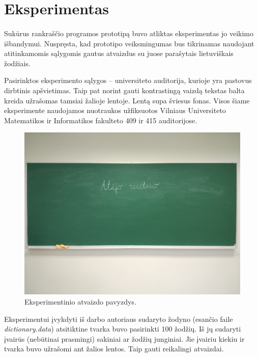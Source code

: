 \documentclass[a4paper,12pt]{article}
\begin{document}
\clearpage
\section{Eksperimentas}
\paragraph{} Sukūrus rankraščio programos prototipą buvo atliktas eksperimentas jo veikimo išbandymui. Nuspręsta, kad prototipo veiksmingumas bus tikrinamas naudojant atitinkamomis sąlygomis gautus atvaizdus su juose parašytais lietuviškais žodžiais.

Pasirinktos eksperimento sąlygos – universiteto auditorija, kurioje yra pastovus dirbtinis apšvietimas. Taip pat norint gauti kontrastingą vaizdą tekstas balta kreida užrašomas tamsiai žalioje lentoje. Lentą supa šviesus fonas. Visos šiame eksperimente naudojamos nuotraukos užfiksuotos Vilniaus Universiteto Matematikos ir Informatikos fakulteto 409 ir 415 auditorijose.

		\begin{figure}[H]
			\centering
			\includegraphics[scale=0.3]{images/sampleboard}
			\caption{Eksperimentinio atvaizdo pavyzdys.}   %
			\label{img:sampleboard}
		\end{figure}

Eksperimentui įvykdyti iš darbo autoriaus sudaryto žodyno (esančio faile \textit{dictionary.data}) atsitiktine tvarka buvo pasirinkti 100 žodžių. Iš jų sudaryti įvairūs (nebūtinai prasmingi) sakiniai ar žodžių junginiai. Jie įvairiu kiekiu ir tvarka buvo užrašomi ant žalios lentos. Taip gauti reikalingi atvaizdai.
\end{document}
